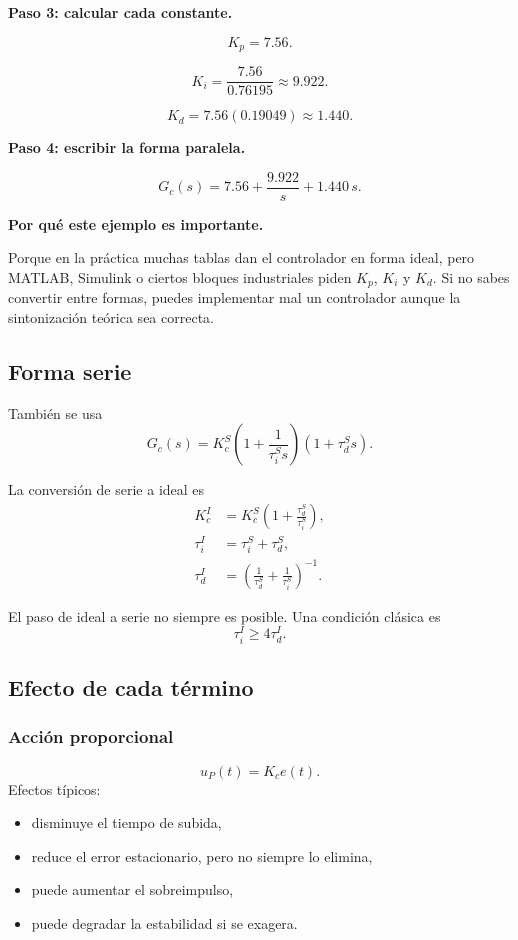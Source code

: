 \documentclass[11pt]{article}
\begin{document}
\textbf{Paso 3: calcular cada constante.}

\[
K_p=7.56.
\]

\[
K_i=\frac{7.56}{0.76195}\approx 9.922.
\]

\[
K_d=7.56(0.19049)\approx 1.440.
\]

\textbf{Paso 4: escribir la forma paralela.}

\[
G_c(s)=7.56+\frac{9.922}{s}+1.440\,s.
\]

\textbf{Por qu\'e este ejemplo es importante.}

Porque en la pr\'actica muchas tablas dan el controlador en forma ideal, pero MATLAB, Simulink o ciertos bloques industriales piden $K_p$, $K_i$ y $K_d$. Si no sabes convertir entre formas, puedes implementar mal un controlador aunque la sintonizaci\'on te\'orica sea correcta.

\subsection{Forma serie}
Tambi\'en se usa
\begin{equation}
G_c(s)=K_c^S\left(1+\frac{1}{\tau_i^S s}\right)\left(1+\tau_d^S s\right).
\end{equation}

La conversi\'on de serie a ideal es
\begin{align}
K_c^I &= K_c^S\left(1+\frac{\tau_d^S}{\tau_i^S}\right),\\
\tau_i^I &= \tau_i^S+\tau_d^S,\\
\tau_d^I &= \left(\frac{1}{\tau_d^S}+\frac{1}{\tau_i^S}\right)^{-1}.
\end{align}

El paso de ideal a serie no siempre es posible. Una condici\'on cl\'asica es
\begin{equation}
\tau_i^I \ge 4\tau_d^I.
\end{equation}

\subsection{Efecto de cada t\'ermino}
\subsubsection{Acci\'on proporcional}
\[
u_P(t)=K_c e(t).
\]
Efectos t\'ipicos:
\begin{itemize}
\item disminuye el tiempo de subida,
\item reduce el error estacionario, pero no siempre lo elimina,
\item puede aumentar el sobreimpulso,
\item puede degradar la estabilidad si se exagera.
\end{itemize}
\end{document}
